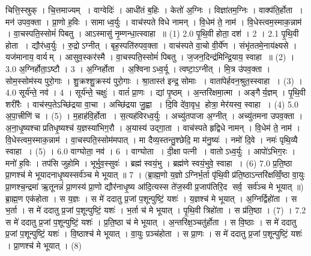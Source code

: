 
\setcounter{anuvakam}{0}
चित्ति॒स्स्रुक् । चि॒त्तमाज्यम् । वाग्वेदिः॑ । आधी॑तं ब॒\ar{}हिः । केतो॑ अ॒ग्निः । विज्ञा॑तम॒ग्निः । वाक्प॑ति॒र्\mbox{}होता । मन॑ उपव॒क्ता । प्रा॒णो ह॒विः । सामाध्व॒र्युः । वाच॑स्पते विधे नामन् । वि॒धेम॑ ते॒ नाम॑ । वि॒धेस्त्वम॒स्माक॒न्नाम॑ । वा॒चस्पति॒स्सोमं॑ पिबतु । आऽस्मासु॑ नृ॒म्णन्धा॒त्स्वाहा ॥ (1)
2.0
पृ॒थि॒वी होता॒ दश॑ । 2 ।
2.1
पृ॒थि॒वी होता । द्यौर॑ध्व॒र्युः । रु॒द्रोऽग्नीत् । बृह॒स्पति॑रुपव॒क्ता । वाच॑स्पते वा॒चो वी॒र्ये॑ण । संभृ॑ततमे॒नाय॑क्ष्यसे । यज॑मानाय॒ वार्यम् । आसुव॒स्कर॑स्मै । वा॒चस्पति॒स्सोमं॑ पिबतु । ज॒जन॒दिन्द्र॑मिन्द्रि॒याय॒ स्वाहा ॥ (2) ।
3.0
अ॒ग्निर्होता॒ऽष्टौ । 3 ।
अ॒ग्निर्\mbox{}होता । अ॒श्विनाऽध्व॒र्यू । त्वष्टा॒ऽग्नीत् । मि॒त्र उ॑पव॒क्ता । सोम॒स्सोम॑स्य पुरो॒गाः । शु॒क्रश्शु॒क्रस्य॑ पुरो॒गाः । श्रा॒तास्त॑ इन्द्र॒ सोमाः । वाता॑पेर्\mbox{}हवन॒श्रुत॒स्स्वाहा । (3) ।
4.0
सूर्य॑न्ते॒ नव॑ । 4 ।
सूर्य॑न्ते॒ चक्षुः॑ । वातं॑ प्रा॒णः । द्यां पृ॒ष्ठम् । अ॒न्तरि॑क्षमा॒त्मा । अङ्गैर्य॒ज्ञम् । पृ॒थि॒वी शरी॑रैः । वाच॑स्प॒तेऽच्छि॑द्रया वा॒चा । अच्छि॑द्रया जु॒ह्वा । दि॒वि दे॑वा॒वृध॒ होत्रा॒ मेर॑यस्व॒ स्वाहा । (4)
5.0
अ॒पा॒त्त्रीणि॑ च । (5) ।
म॒हाह॑वि॒र्\mbox{}होता । स॒त्यह॑विरध्व॒र्युः । अच्यु॑तपाजा अ॒ग्नीत् । अच्यु॑तमना उपव॒क्ता । अ॒ना॒धृ॒ष्यश्चाप्रतिधृ॒ष्यश्च॑ य॒ज्ञस्या॑भिग॒रौ । अ॒यास्य॑ उद्गा॒ता । वाच॑स्पते हृद्विधे नामन् । वि॒धेम॑ ते॒ नाम॑ । वि॒धेस्त्वम॒स्माक॒न्नाम॑ । वा॒चस्पति॒स्सोम॑मपात् । मा दैव्य॒स्तन्तु॒श्छेदि॒ मा म॑नु॒ष्यः॑ । नमो॑ दि॒वे । नमः॑ पृथि॒व्यै स्वाहा । (5) ।
6.0
वाग्घोता॒ नव॑ । 6 ।
वाग्घोता । दी॒क्षा पत्नी । वातोऽध्व॒र्युः । आपो॑ऽभिग॒रः । मनो॑ ह॒विः । तप॑सि जुहोमि । भूर्भुव॒स्सुवः॑ । ब्रह्म॑ स्वयं॒भु । ब्रह्म॑णे स्वयं॒भुवे॒ स्वाहा । (6)
7.0
प्र॒ति॒ष्ठा प्रा॒णश्च॑ मे भूयादनाधृ॒ष्यस्सर्व॑ञ्च मे भूयात् ॥ 7 । (ब्रा॒ह्म॒णो य॒ज्ञोऽग्निर्भ॒र्ता पृ॑थि॒वी प्र॑ति॒ष्ठाऽन्तरि॑क्षव्विँ॒ष्ठा वा॒युः प्रा॒णश्च॒न्द्रमा॑ ऋ॒तूनन्नं॑ प्रा॒णस्य॑ प्रा॒णो द्यौर॑नाधृ॒ष्य आ॑दि॒त्यस्स ते॑ज॒स्वी प्र॒जाप॑तिरि॒द सर्व॒ सर्व॑ञ्च मे भूयात् ॥)
ब्रा॒ह्म॒ण एक॑होता । स य॒ज्ञः । स मे॑ ददातु प्र॒जां प॒शून्पुष्टिं॒ यशः॑ । य॒ज्ञश्च॑ मे भूयात् । अ॒ग्निर्द्विहो॑ता । स भ॒र्ता । स मे॑ ददातु प्र॒जां प॒शून्पुष्टिं॒ यशः॑ । भ॒र्ता च॑ मे भूयात् । पृ॒थि॒वी त्रिहो॑ता । स प्र॑ति॒ष्ठा । (7) ।
7.2
स मे॑ ददातु प्र॒जां प॒शून्पुष्टिं॒ यशः॑ । प्र॒ति॒ष्ठा च॑ मे भूयात् । अ॒न्तरि॑क्ष॒ञ्चतु॑र्\mbox{}होता । स वि॒ष्ठाः । स मे॑ ददातु प्र॒जां प॒शून्पुष्टिं॒ यशः॑ । वि॒ष्ठाश्च॑ मे भूयात् । वा॒युः प़ञ्च॑होता । स प्रा॒णः । स मे॑ ददातु प्र॒जां प॒शून्पुष्टिं॒ यशः॑ । प्रा॒णश्च॑ मे भूयात् । (8)
